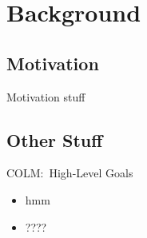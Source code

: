 \section{Background}
\subsection{Motivation}
\begin{frame}{Motivation}
  stuff
\end{frame}
\subsection{Other Stuff}
\begin{frame}{COLM:~High-Level Goals}
  \begin{itemize}
    \item hmm
    \item ????
  \end{itemize}
\end{frame}